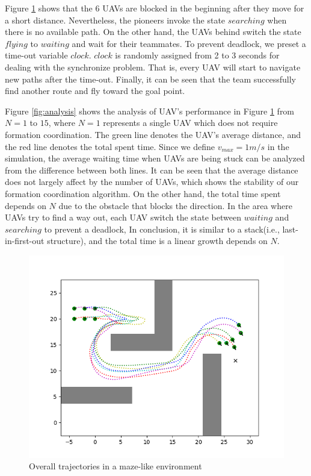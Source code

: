 Figure \ref{fig:maze} shows that the 6 UAVs are blocked in the beginning after they move for a short distance. Nevertheless, the pioneers invoke the state $searching$ when there is no available path. On the other hand, the UAVs behind switch the state $flying$ to $waiting$ and wait for their teammates. To prevent deadlock, we preset a time-out variable $clock$. $clock$ is randomly assigned from 2 to 3 seconds for dealing with the synchronize problem. That is, every UAV will start to navigate new paths after the time-out. Finally, it can be seen that the team successfully find another route and fly toward the goal point.

Figure \ref{fig:analysis} shows the analysis of UAV's performance in Figure \ref{fig:maze} from $N = 1$ to $15$, where $N=1$ represents a single UAV which does not require formation coordination. The green line denotes the UAV's average distance, and the red line denotes the total spent time. Since we define $v_{max} = 1m/s$ in the simulation, the
average waiting time when UAVs are being stuck can be analyzed from the difference between both lines. It can be seen that the average distance does not largely affect by the number of UAVs, which shows the stability of our formation coordination algorithm. On the other hand, the total time spent depends on $N$ due to the obstacle that blocks the direction. In the area where UAVs try to find a way out, each UAV switch the state between $waiting$ and $searching$ to prevent a deadlock, In conclusion, it is similar to a stack(i.e., last-in-first-out structure), and the total time is a linear growth depends on $N$.


\begin{figure}[H]
    \centering
    \includegraphics[scale=1]{figures/comprehensive_simulation_2.png}
    \caption{Overall trajectories in a maze-like environment}
    \label{fig:maze}
\end{figure}

